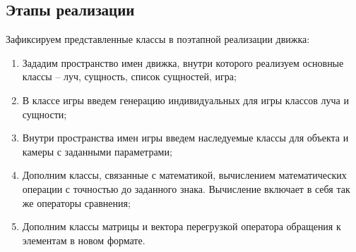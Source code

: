 \subsection{Этапы реализации}

	Зафиксируем представленные классы в поэтапной реализации движка:
	\begin{enumerate}
		\item Зададим пространство имен движка, внутри которого реализуем основные классы -- луч, сущность, список сущностей, игра;
		\item В классе игры введем генерацию индивидуальных для игры классов луча и сущности;
		\item Внутри пространства имен игры введем наследуемые классы для объекта и камеры с заданными параметрами;
		\item Дополним классы, связанные с математикой, вычислением математических операции с точностью до заданного знака. Вычисление включает в себя так же операторы сравнения;
		\item Дополним классы матрицы и вектора перегрузкой оператора обращения к элементам в новом формате.
	\end{enumerate}
